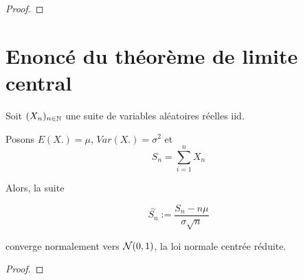 \ifdefined\outputproof
\begin{proof}

\end{proof}
\fi

\section{Enoncé du théorème de limite central}

\begin{theorem}
	Soit $(X_{n})_{n \in \mathbb{N}}$ une suite de variables aléatoires réelles
	iid.

	Posons $E(X.) = \mu$, $Var(X.) = \sigma^{2}$ et
	\begin{equation}
		S_{n} = \sum_{i = 1}^{n} X_{n}
	\end{equation}

	Alors, la suite

	\begin{equation}
		\overset{\sim}{S_{n}} := \frac{S_{n} - n \mu}{\sigma \sqrt{n}}
	\end{equation}

	converge normalement vers $\mathcal{N}(0, 1)$, la loi normale centrée réduite.
\end{theorem}

\ifdefined\outputproof
\begin{proof}

\end{proof}
\fi
